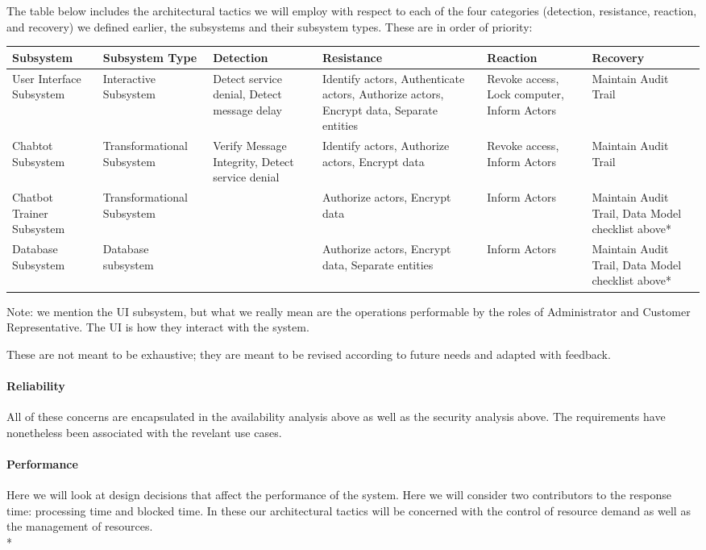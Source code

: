 \documentclass[11pt]{article}
\begin{document}
The table below includes the architectural tactics we will employ with respect to each of the four categories (detection, resistance, reaction, and recovery) we defined earlier, the subsystems and their subsystem types. These are in order of priority:
\begin{center}
	\hspace*{-1.5cm}\begin{tabular}{|p{3cm}|p{3cm}|p{3cm}|p{3cm}|p{3cm}|p{3cm}|}
		\hline
		Subsystem & Subsystem Type & Detection & Resistance & Reaction & Recovery \\
		\hline
		User Interface Subsystem & Interactive Subsystem & Detect service denial, Detect message delay & Identify actors, Authenticate actors, Authorize actors, Encrypt data, Separate entities & Revoke access, Lock computer, Inform Actors & Maintain Audit Trail \\
		\hline
		Chabtot Subsystem & Transformational Subsystem & Verify Message Integrity, Detect service denial & Identify actors, Authorize actors, Encrypt data & Revoke access, Inform Actors & Maintain Audit Trail \\
		\hline
		Chatbot Trainer Subsystem & Transformational Subsystem & & Authorize actors, Encrypt data & Inform Actors & Maintain Audit Trail, Data Model checklist above* \\
		\hline
		Database Subsystem & Database subsystem & & Authorize actors, Encrypt data, Separate entities & Inform Actors & Maintain Audit Trail, Data Model checklist above* \\
		\hline
	\end{tabular}
\end{center}
Note: we mention the UI subsystem, but what we really mean are the operations performable by the roles of Administrator and Customer Representative. The UI is how they interact with the system.

These are not meant to be exhaustive; they are meant to be revised according to future needs and adapted with feedback.

\paragraph{Reliability}
All of these concerns are encapsulated in the availability analysis above as well as the security analysis above. The requirements have nonetheless been associated with the revelant use cases.

\paragraph{Performance}
Here we will look at design decisions that affect the performance of the system. Here we will consider two contributors to the response time: processing time and blocked time\cite{Book:2}. In these our architectural tactics will be concerned with the control of resource demand as well as the management of resources. \\*
\end{document}

